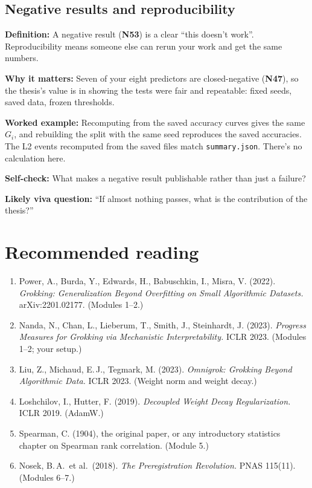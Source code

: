 \documentclass[11pt,a4paper,oneside,openany]{report}
\newcommand{\code}[1]{\texttt{#1}}
\newcommand{\gl}[1]{\textbf{#1}}   %
\newcommand{\fdef}{\textbf{Definition:} }
\newcommand{\fwhy}{\par\textbf{Why it matters:} }
\newcommand{\fex}{\par\textbf{Worked example:} }
\newcommand{\fself}{\par\textbf{Self-check:} }
\newcommand{\fviva}{\par\textbf{Likely viva question:} }
\begin{document}
\section{Negative results and reproducibility}
\fdef A negative result (\gl{N53}) is a clear ``this doesn't work''. Reproducibility means someone else can rerun your work and get the same numbers.
\fwhy Seven of your eight predictors are closed-negative (\gl{N47}), so the thesis's value is in showing the tests were fair and repeatable: fixed seeds, saved data, frozen thresholds.
\fex Recomputing from the saved accuracy curves gives the same $G_i$, and rebuilding the split with the same seed reproduces the saved accuracies. The L2 events recomputed from the saved files match \code{summary.json}. There's no calculation here.
\fself What makes a negative result publishable rather than just a failure?
\fviva ``If almost nothing passes, what is the contribution of the thesis?''

\chapter*{Recommended reading}
\begin{sloppypar}
\begin{enumerate}
\item[{[1]}] Power, A., Burda, Y., Edwards, H., Babuschkin, I., Misra, V. (2022). \emph{Grokking: Generalization Beyond Overfitting on Small Algorithmic Datasets.} arXiv:2201.02177. (Modules 1--2.)
\item[{[2]}] Nanda, N., Chan, L., Lieberum, T., Smith, J., Steinhardt, J. (2023). \emph{Progress Measures for Grokking via Mechanistic Interpretability.} ICLR 2023. (Modules 1--2; your setup.)
\item[{[3]}] Liu, Z., Michaud, E.\,J., Tegmark, M. (2023). \emph{Omnigrok: Grokking Beyond Algorithmic Data.} ICLR 2023. (Weight norm and weight decay.)
\item[{[4]}] Loshchilov, I., Hutter, F. (2019). \emph{Decoupled Weight Decay Regularization.} ICLR 2019. (AdamW.)
\item[{[5]}] Spearman, C. (1904), the original paper, or any introductory statistics chapter on Spearman rank correlation. (Module 5.)
\item[{[6]}] Nosek, B.\,A.\ et al.\ (2018). \emph{The Preregistration Revolution.} PNAS 115(11). (Modules 6--7.)
\end{enumerate}
\end{sloppypar}
\end{document}
